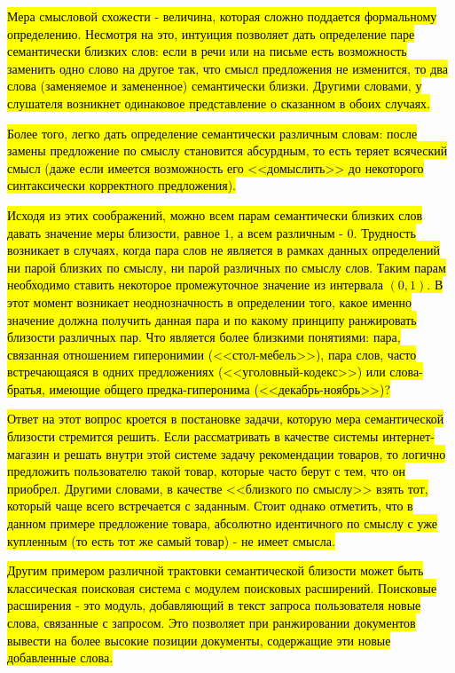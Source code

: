 \hl{Мера смысловой схожести - величина, которая сложно поддается формальному определению. Несмотря на это, интуиция позволяет дать определение паре семантически близких слов: если в речи или на письме есть возможность заменить одно слово на другое так, что смысл предложения не изменится, то два слова (заменяемое и замененное) семантически близки. Другими словами, у слушателя возникнет одинаковое представление о сказанном в обоих случаях.}

\hl{Более того, легко дать определение семантически различным словам: после замены предложение по смыслу становится абсурдным, то есть теряет всяческий смысл (даже если имеется возможность его <<домыслить>> до некоторого синтаксически корректного предложения).}

\hl{Исходя из этих соображений, можно всем парам семантически близких слов давать значение меры близости, равное $1$, а всем различным - $0$. Трудность возникает в случаях, когда пара слов не является в рамках данных определений ни парой близких по смыслу, ни парой различных по смыслу слов. Таким парам необходимо ставить некоторое промежуточное значение из интервала $(0, 1)$. В этот момент возникает неоднозначность в определении того, какое именно значение должна получить данная пара и по какому принципу ранжировать близости различных пар.  Что является более близкими понятиями: пара, связанная отношением гиперонимии (<<стол-мебель>>), пара слов, часто встречающаяся в одних предложениях (<<уголовный-кодекс>>) или слова-братья, имеющие общего предка-гиперонима (<<декабрь-ноябрь>>)?}

\hl{Ответ на этот вопрос кроется в постановке задачи, которую мера семантической близости стремится решить. Если рассматривать в качестве системы интернет-магазин и решать внутри этой системе задачу рекомендации товаров, то логично предложить пользователю такой товар, которые часто берут с тем, что он приобрел. Другими словами, в качестве <<близкого по смыслу>> взять тот, который чаще всего встречается с заданным. Стоит однако отметить, что в данном примере предложение товара, абсолютно идентичного по смыслу с уже купленным (то есть тот же самый товар) - не имеет смысла.}

\hl{Другим примером различной трактовки семантической близости может быть классическая поисковая система с модулем поисковых расширений. Поисковые расширения - это модуль, добавляющий в текст запроса пользователя новые слова, связанные с запросом. Это позволяет при ранжировании документов вывести на более высокие позиции документы, содержащие эти новые добавленные слова. }

